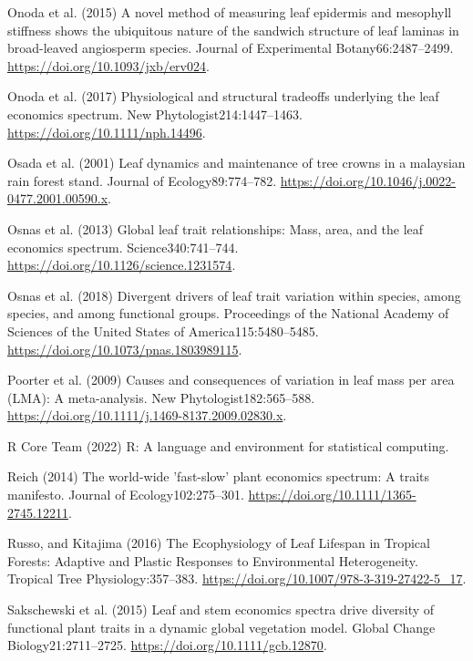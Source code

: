 \documentclass[
  12pt,
  letterpaper,
  DIV=11,
  numbers=noendperiod]{scrartcl}
\newlength{\cslhangindent}
\newenvironment{CSLReferences}[2] %
 {\begin{list}{}{%
  \setlength{\itemindent}{0pt}
  \setlength{\leftmargin}{0pt}
  \setlength{\parsep}{0pt}
  \ifodd #1
   \setlength{\leftmargin}{\cslhangindent}
   \setlength{\itemindent}{-1\cslhangindent}
  \fi
  \setlength{\itemsep}{#2\baselineskip}}}
 {\end{list}}
\begin{document}
\begin{CSLReferences}{1}{1}
Onoda et al. (2015) A novel method of measuring leaf epidermis and
mesophyll stiffness shows the ubiquitous nature of the sandwich
structure of leaf laminas in broad-leaved angiosperm species. Journal of
Experimental Botany66:2487--2499.
\url{https://doi.org/10.1093/jxb/erv024}.

Onoda et al. (2017) Physiological and structural tradeoffs underlying
the leaf economics spectrum. New Phytologist214:1447--1463.
\url{https://doi.org/10.1111/nph.14496}.

Osada et al. (2001) Leaf dynamics and maintenance of tree crowns in a
malaysian rain forest stand. Journal of Ecology89:774--782.
\url{https://doi.org/10.1046/j.0022-0477.2001.00590.x}.

Osnas et al. (2013) Global leaf trait relationships: {Mass}, area, and
the leaf economics spectrum. Science340:741--744.
\url{https://doi.org/10.1126/science.1231574}.

Osnas et al. (2018) Divergent drivers of leaf trait variation within
species, among species, and among functional groups. Proceedings of the
National Academy of Sciences of the United States of
America115:5480--5485. \url{https://doi.org/10.1073/pnas.1803989115}.

Poorter et al. (2009) Causes and consequences of variation in leaf mass
per area ({LMA}): {A} meta-analysis. New Phytologist182:565--588.
\url{https://doi.org/10.1111/j.1469-8137.2009.02830.x}.

R Core Team (2022) R: {A} language and environment for statistical
computing.

Reich (2014) The world-wide 'fast-slow' plant economics spectrum: {A}
traits manifesto. Journal of Ecology102:275--301.
\url{https://doi.org/10.1111/1365-2745.12211}.

Russo, and Kitajima (2016) The {Ecophysiology} of {Leaf Lifespan} in
{Tropical Forests}: {Adaptive} and {Plastic Responses} to {Environmental
Heterogeneity}. Tropical {Tree Physiology}:357--383.
\url{https://doi.org/10.1007/978-3-319-27422-5_17}.

Sakschewski et al. (2015) Leaf and stem economics spectra drive
diversity of functional plant traits in a dynamic global vegetation
model. Global Change Biology21:2711--2725.
\url{https://doi.org/10.1111/gcb.12870}.


\end{CSLReferences}
\end{document}
